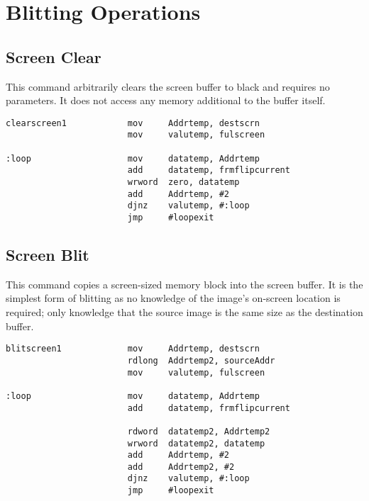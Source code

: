 \newpage
\section{Blitting Operations}



\subsection*{Screen Clear}

This command arbitrarily clears the screen buffer to black and requires no parameters.  It does not access any memory additional to the buffer itself.

\lstset{style=pasm}
\begin{lstlisting}
clearscreen1            mov     Addrtemp, destscrn
                        mov     valutemp, fulscreen
       
:loop                   mov     datatemp, Addrtemp
                        add     datatemp, frmflipcurrent
                        wrword  zero, datatemp
                        add     Addrtemp, #2
                        djnz    valutemp, #:loop
                        jmp     #loopexit
\end{lstlisting}





\subsection*{Screen Blit}

This command copies a screen-sized memory block into the screen buffer.  It is the simplest form of blitting as no knowledge of the image's on-screen location is required; only knowledge that the source image is the same size as the destination buffer.

\begin{lstlisting}
blitscreen1             mov     Addrtemp, destscrn
                        rdlong  Addrtemp2, sourceAddr
                        mov     valutemp, fulscreen
       
:loop                   mov     datatemp, Addrtemp
                        add     datatemp, frmflipcurrent
           
                        rdword  datatemp2, Addrtemp2
                        wrword  datatemp2, datatemp
                        add     Addrtemp, #2
                        add     Addrtemp2, #2
                        djnz    valutemp, #:loop
                        jmp     #loopexit
\end{lstlisting}





